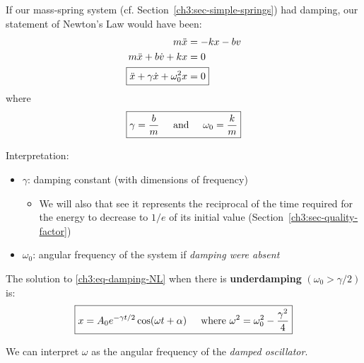 If our mass-spring system (cf. Section~\ref{ch3:sec-simple-springs}) had damping, our statement of Newton's Law would have been:
\begin{align}
	m\ddot{x} &= -kx - bv \notag \\
	m\ddot{x} + b\dot{v} + kx &= 0 \notag  \\
	\Aboxed{\ddot{x} + \gamma \dot{x} + \omega_0^2 x &= 0} \label{ch3:eq-damping-NL}
\end{align}
where
\[ \boxed{\gamma = \frac{b}{m} \hspace{0.5cm}\text{and}\hspace{0.5cm} \omega_0 = \frac{k}{m}} \]

Interpretation:
\begin{itemize}
	\item $\gamma$: damping constant (with dimensions of frequency)
	\begin{itemize}
		\item We will also that see it represents the reciprocal of the time required for the energy to decrease to $1/e$ of its initial value (Section~\ref{ch3:sec-quality-factor})
	\end{itemize}
	\item $\omega_0$: angular frequency of the system if \emph{damping were absent}
\end{itemize}

The solution to \eqref{ch3:eq-damping-NL} when there is \textbf{underdamping} $(\omega_0>\gamma/2)$ is:
\begin{equation}
\boxed{
	 x = A_0 e^{-\gamma t/2} \cos(\omega t + \alpha) \hspace{0.5cm}\text{where } \omega ^2 = \omega_0^2 - \frac{\gamma^2}{4} 
}	\label{ch3:eq-damping-solution}
\end{equation}

We can interpret $\omega$ as the angular frequency of the \emph{damped oscillator}.


